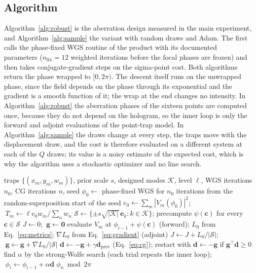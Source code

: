 \subsection{Algorithm}

Algorithm~\ref{alg:robust} is the aberration design measured in the main experiment, and Algorithm~\ref{alg:sample} the variant with random draws and Adam. The first calls the phase-fixed WGS routine of the product with its documented parameters ($n_{\mathrm{fix}}=12$ weighted iterations before the focal phases are frozen) and then
takes conjugate-gradient steps on the sigma-point cost. Both algorithms return the phase wrapped to $[0,2\pi)$. The descent itself runs on the unwrapped phase, since the field depends on the phase through its exponential and the gradient is a smooth function of it; the wrap at the end changes no intensity. In Algorithm~\ref{alg:robust} the aberration phases of the sixteen points are computed once, because they do not depend on the hologram, so the inner loop is only the forward and adjoint evaluations of the point-trap model. In Algorithm~\ref{alg:sample} the draws change at every step, the traps move with the displacement draw, and the cost is therefore evaluated on a different system at each of the $Q$ draws; its value is a noisy estimate of the expected cost, which is why the algorithm uses a stochastic optimizer and no line search.

\begin{algorithm}[t]
\caption{Aberration-robust hologram with the sigma-point design (the design of the main experiment).}
\label{alg:robust}
\begin{algorithmic}[1]
\Require traps $\{(x_m,y_m,w_m)\}$, prior scale $s$, designed modes $\mathcal K$, level $\ell$, WGS iterations $n_0$, CG iterations $n$, seed
\State $\phi_0\gets$ phase-fixed WGS for $n_0$ iterations from the random-superposition start of the seed
\State $e_0\gets\sum_m|V_m(\phi_0)|^2$; $\ T_m\gets\ell e_0w_m/\sum_nw_n$
\State $\mathcal S\gets\{\pm s\sqrt{|\mathcal K|}\,\mathbf e_k:k\in\mathcal K\}$; precompute $\psi(\mathbf c)$ for every $\mathbf c\in\mathcal S$
\State $J\gets0$; $\ \mathbf g\gets\mathbf 0$
\State evaluate $V_m$ at $\phi_{i-1}+\psi(\mathbf c)$ (forward); $L_0$ from Eq.~\eqref{eq:metrics}; $\nabla L_0$ from Eq.~\eqref{eq:gradient} (adjoint)
\State $J\gets J+L_0/|\mathcal S|$; $\ \mathbf g\gets\mathbf g+\nabla L_0/|\mathcal S|$
\EndFor
\State $\mathbf d\gets-\mathbf g+\gamma\mathbf d_{\mathrm{prev}}$ (Eq.~\eqref{eq:cg}); restart with $\mathbf d\gets-\mathbf g$ if $\mathbf g^{\top}\mathbf d\ge0$
\State find $\alpha$ by the strong-Wolfe search (each trial repeats the inner loop); $\ \phi_i\gets\phi_{i-1}+\alpha\mathbf d$
\EndFor
\State \Return $\phi_n\bmod2\pi$
\end{algorithmic}
\end{algorithm}


